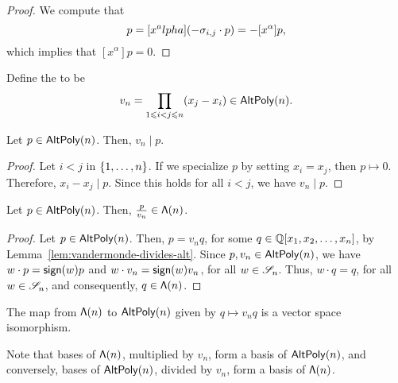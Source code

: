 \begin{proof}
    We compute that     
    \begin{equation}
        [x^\alpha] p = [x^alpha] (- \eltr{i, j} \cdot p) = - [x^\alpha] p,
    \end{equation}
    which implies that \([x^\alpha] p = 0\).
\end{proof}

\begin{definition}
    Define the  to be
    \begin{equation}
        v_n = \prod_{1 \leqslant i < j \leqslant n} (x_j - x_i) \in \operatorname{\mathsf{AltPoly}}(n).
    \end{equation}
\end{definition}

\begin{lemma} \label{lem:vandermonde-divides-alt}
    Let \(p \in \operatorname{\mathsf{AltPoly}}(n)\).
    Then, \(v_n \mid p\).
\end{lemma}

\begin{proof}
    Let \(i < j\) in \(\interval{n}\).
    If we specialize \(p\) by setting \(x_i = x_j\), then \(p \mapsto 0\).
    Therefore, \(x_i - x_j \mid p\).
    Since this holds for all \(i < j\), we have \(v_n \mid p\).
\end{proof}

\begin{lemma} \label{lem:vandermonde-times-sym-is-alt}
    Let \(p \in \operatorname{\mathsf{AltPoly}}(n)\).
    Then, \(\frac{p}{v_n} \in \operatorname{\mathsf{\Lambda}}(n)\).
\end{lemma}

\begin{proof}
    Let \(p \in \operatorname{\mathsf{AltPoly}}(n)\).
    Then, \(p = v_n q\), for some \(q \in \mathbb{Q}[x_1, x_2, \ldots, x_n]\),
    by Lemma~\ref{lem:vandermonde-divides-alt}.
    Since \(p, v_n \in \operatorname{\mathsf{AltPoly}}(n)\),
    we have \(w \cdot p = \operatorname{\mathsf{sign}}(w) p\) and \(w \cdot v_n = \operatorname{\mathsf{sign}}(w) v_n\), for all \(w \in \mathscr{S}_{n}\).
    Thus, \(w \cdot q = q\), for all \(w \in \mathscr{S}_{n}\), and consequently, \(q \in \operatorname{\mathsf{\Lambda}}(n)\).
\end{proof}

\begin{corollary}
    The map from \(\operatorname{\mathsf{\Lambda}}(n)\) to \(\operatorname{\mathsf{AltPoly}}(n)\) given by \(q \mapsto v_n q\) is a vector space isomorphism.
\end{corollary}

Note that bases of \(\operatorname{\mathsf{\Lambda}}(n)\), multiplied by \(v_n\), form a basis of \(\operatorname{\mathsf{AltPoly}}(n)\), and conversely, bases of \(\operatorname{\mathsf{AltPoly}}(n)\), divided by \(v_n\), form a basis of \(\operatorname{\mathsf{\Lambda}}(n)\).

